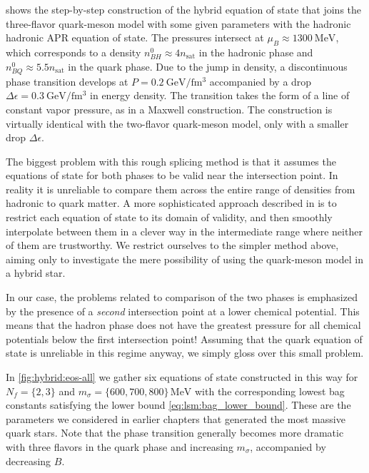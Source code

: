  shows the step-by-step construction of the hybrid equation of state
that joins the three-flavor quark-meson model with some given parameters
with the hadronic hadronic APR equation of state.
The pressures intersect at $\mu_B \approx \SI{1300}{\mega\electronvolt}$,
which corresponds to a density $n_{BH}^0 \approx 4 n_\text{sat}$ in the hadronic phase
and $n_{BQ}^0 \approx 5.5 n_\text{sat}$ in the quark phase.
Due to the jump in density,
a discontinuous phase transition develops at $P = \SI{0.2}{\giga\electronvolt\per\femto\meter\cubed}$
accompanied by a drop $\Delta \epsilon = \SI{0.3}{\giga\electronvolt\per\femto\meter\cubed}$ in energy density.
The transition takes the form of a line of constant vapor pressure, as in a Maxwell construction.
The construction is virtually identical with the two-flavor quark-meson model,
only with a smaller drop $\Delta \epsilon$.

The biggest problem with this rough splicing method is that it assumes the equations of state for both phases to be valid near the intersection point.
In reality it is unreliable to compare them across the entire range of densities from hadronic to quark matter.
A more sophisticated approach described in \cite[section V-F]{ref:quark_star_review}
is to restrict each equation of state to its domain of validity,
and then smoothly interpolate between them in a clever way
in the intermediate range where neither of them are trustworthy.
We restrict ourselves to the simpler method above,
aiming only to investigate the mere possibility of using the quark-meson model in a hybrid star.

In our case,
the problems related to comparison of the two phases is emphasized
by the presence of a \emph{second} intersection point at a lower chemical potential.
This means that the hadron phase does not have the greatest pressure for all chemical potentials below the first intersection point!
Assuming that the quark equation of state is unreliable in this regime anyway,
we simply gloss over this small problem.

In \cref{fig:hybrid:eos-all} we gather six equations of state constructed in this way
for $N_f = \{2,3\}$ and $m_\sigma = \{600,700,800\} \, \si{\mega\electronvolt}$
with the corresponding lowest bag constants satisfying the lower bound \eqref{eq:lsm:bag_lower_bound}.
These are the parameters we considered in earlier chapters that generated the most massive quark stars.
Note that the phase transition generally becomes more dramatic
with three flavors in the quark phase
and increasing $m_\sigma$,
accompanied by decreasing $B$.

